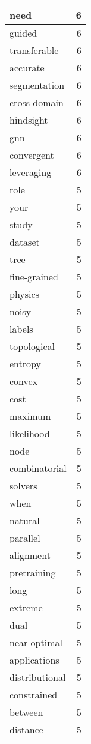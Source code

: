 \begin{table}[h]
\begin{tabular}{|l|r|}
\hline
need & 6 \\
\hline
guided & 6 \\
\hline
transferable & 6 \\
\hline
accurate & 6 \\
\hline
segmentation & 6 \\
\hline
cross-domain & 6 \\
\hline
hindsight & 6 \\
\hline
gnn & 6 \\
\hline
convergent & 6 \\
\hline
leveraging & 6 \\
\hline
role & 5 \\
\hline
your & 5 \\
\hline
study & 5 \\
\hline
dataset & 5 \\
\hline
tree & 5 \\
\hline
fine-grained & 5 \\
\hline
physics & 5 \\
\hline
noisy & 5 \\
\hline
labels & 5 \\
\hline
topological & 5 \\
\hline
entropy & 5 \\
\hline
convex & 5 \\
\hline
cost & 5 \\
\hline
maximum & 5 \\
\hline
likelihood & 5 \\
\hline
node & 5 \\
\hline
combinatorial & 5 \\
\hline
solvers & 5 \\
\hline
when & 5 \\
\hline
natural & 5 \\
\hline
parallel & 5 \\
\hline
alignment & 5 \\
\hline
pretraining & 5 \\
\hline
long & 5 \\
\hline
extreme & 5 \\
\hline
dual & 5 \\
\hline
near-optimal & 5 \\
\hline
applications & 5 \\
\hline
distributional & 5 \\
\hline
constrained & 5 \\
\hline
between & 5 \\
\hline
distance & 5 \\

\end{tabular}
\end{table}

